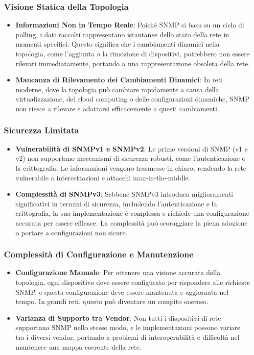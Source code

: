 \documentclass[target=bach,aauheader=,style=]{thud}
\begin{document}
\subsubsection{ Visione Statica della Topologia}
  \begin{itemize}
    \item \textbf{Informazioni Non in Tempo Reale}: Poiché SNMP si basa su un ciclo di polling, i dati raccolti rappresentano istantanee dello stato della rete in momenti specifici. Questo significa che i cambiamenti dinamici nella topologia, come l'aggiunta o la rimozione di dispositivi, potrebbero non essere rilevati immediatamente, portando a una rappresentazione obsoleta della rete.
    \item \textbf{Mancanza di Rilevamento dei Cambiamenti Dinamici}: In reti moderne, dove la topologia può cambiare rapidamente a causa della virtualizzazione, del cloud computing o delle configurazioni dinamiche, SNMP non riesce a rilevare e adattarsi efficacemente a questi cambiamenti.
  \end{itemize}


\subsubsection{Sicurezza Limitata}
    \begin{itemize}
      \item \textbf{Vulnerabilità di SNMPv1 e SNMPv2}: Le prime versioni di SNMP (v1 e v2) non supportano meccanismi di sicurezza robusti, come l'autenticazione o la crittografia. Le informazioni vengono trasmesse in chiaro, rendendo la rete vulnerabile a intercettazioni e attacchi man-in-the-middle.
      \item \textbf{Complessità di SNMPv3}: Sebbene SNMPv3 introduca miglioramenti significativi in termini di sicurezza, includendo l'autenticazione e la crittografia, la sua implementazione è complessa e richiede una configurazione accurata per essere efficace. La complessità può scoraggiare la piena adozione o portare a configurazioni non sicure.
    \end{itemize}

\subsubsection{Complessità di Configurazione e Manutenzione}
    \begin{itemize}
      \item \textbf{Configurazione Manuale}: Per ottenere una visione accurata della topologia, ogni dispositivo deve essere configurato per rispondere alle richieste SNMP, e questa configurazione deve essere mantenuta e aggiornata nel tempo. In grandi reti, questo può diventare un compito oneroso.
      \item \textbf{Varianza di Supporto tra Vendor}: Non tutti i dispositivi di rete supportano SNMP nello stesso modo, e le implementazioni possono variare tra i diversi vendor, portando a problemi di interoperabilità e difficoltà nel mantenere una mappa coerente della rete.
    \end{itemize}
\end{document}
